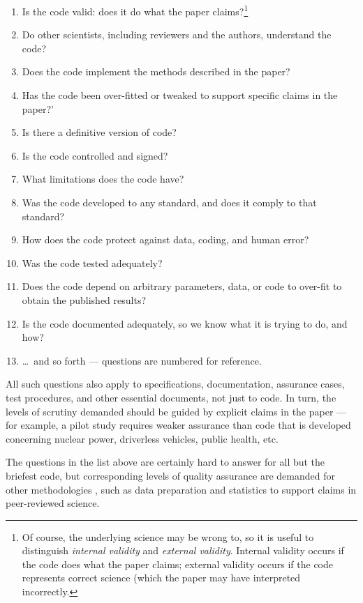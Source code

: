\documentclass{comjnl}
\begin{document}
\newcount \enum
{}
\renewcommand{\theenumi}{\ifnum \enum<10 \hphantom{0}\fi
\the\enum
\global\advance \enum by 1}
\begin{enumerate}\raggedright
\item Is the code valid: does it do what the paper claims?\footnote{Of course, the underlying science may be wrong to, so it is useful to distinguish \emph{internal validity\/} and \emph{external validity}. Internal validity occurs if the code does what the paper claims; external validity occurs if the code represents correct science (which the paper may have interpreted incorrectly.}
\item Do other scientists, including reviewers and the authors, understand the code?
\item Does the code implement the methods described in the paper?
\item Has the code been over-fitted or tweaked to support specific claims in the paper?'
\item Is there a definitive version of code?
\item Is the code controlled and signed?
\item What limitations does the code have?
\item Was the code developed to any standard, and does it comply to that standard?
\item How does the code protect against data, coding, and human error?
\item Was the code tested adequately?
\item Does the code depend on arbitrary parameters, data, or code to over-fit to obtain the published results?
\item Is the code documented adequately, so we know what it is trying to do, and how?
\item \ldots\ and so forth --- questions are numbered for reference. 
\end{enumerate}

All such questions also apply to specifications, documentation, assurance cases, test procedures, and other essential documents, not just to code. In turn, the levels of scrutiny demanded should be guided by explicit claims in the paper \cite{essence-of-software} --- for example, a pilot study requires weaker assurance than code that is developed concerning nuclear power, driverless vehicles, public health, etc. 

The questions in the list above are certainly hard to answer for all but the briefest code, but corresponding levels of quality assurance are demanded for other methodologies \cite{notebooks,popper-conjectures-refutations,tripod,prisma,nih-policy,nih-nature}, such as data preparation and statistics to support claims in peer-reviewed science. 
\end{document}
